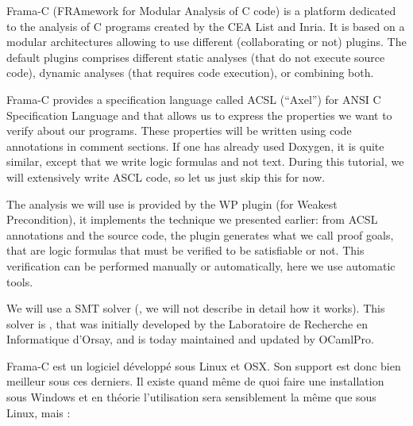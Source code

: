 
\begin{center}
\end{center}





Frama-C (FRAmework for Modular Analysis of C code) is a platform
dedicated to the analysis of C programs created by the CEA List and
Inria. It is based on a modular architectures allowing to use different
(collaborating or not) plugins. The default plugins comprises different
static analyses (that do not execute source code), dynamic analyses
(that requires code execution), or combining both.



Frama-C provides a specification language called ACSL (``Axel'') for
ANSI C Specification Language and that allows us to express the
properties we want to verify about our programs. These properties will
be written using code annotations in comment sections. If one has
already used Doxygen, it is quite similar, except that we write logic
formulas and not text. During this tutorial, we will extensively write
ASCL code, so let us just skip this for now.



The analysis we will use is provided by the WP plugin (for Weakest
Precondition), it implements the technique we presented earlier: from
ACSL annotations and the source code, the plugin generates what we call
proof goals, that are logic formulas that must be verified to be
satisfiable or not. This verification can be performed manually or
automatically, here we use automatic tools.



We will use a SMT solver
(, we will not describe in detail how it works). This solver is
, that was initially developed
by the Laboratoire de Recherche en Informatique d'Orsay, and is today
maintained and updated by OCamlPro.





Frama-C est un logiciel développé sous Linux et OSX. Son support est donc bien
meilleur sous ces derniers. Il existe quand même de quoi faire une installation 
sous Windows et en théorie l'utilisation sera sensiblement la même que sous 
Linux, mais :



